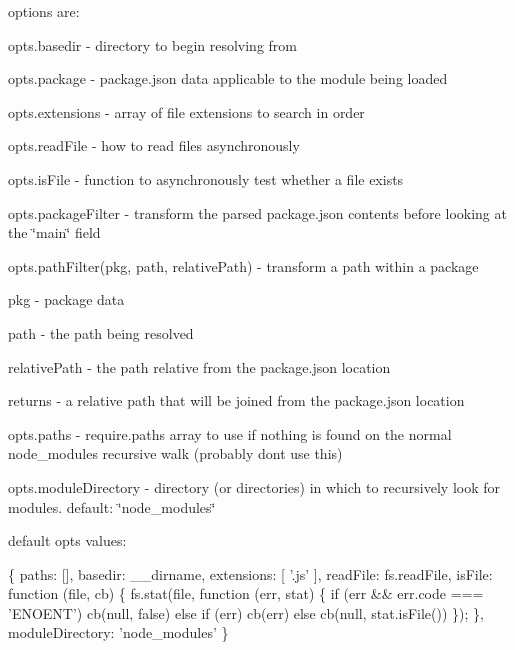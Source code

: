 options are\+:


\begin{DoxyItemize}
\item opts.\+basedir -\/ directory to begin resolving from
\item opts.\+package -\/ {\ttfamily package.\+json} data applicable to the module being loaded
\item opts.\+extensions -\/ array of file extensions to search in order
\item opts.\+read\+File -\/ how to read files asynchronously
\item opts.\+is\+File -\/ function to asynchronously test whether a file exists
\item opts.\+package\+Filter -\/ transform the parsed package.\+json contents before looking at the \char`\"{}main\char`\"{} field
\item opts.\+path\+Filter(pkg, path, relative\+Path) -\/ transform a path within a package
\begin{DoxyItemize}
\item pkg -\/ package data
\item path -\/ the path being resolved
\item relative\+Path -\/ the path relative from the package.\+json location
\item returns -\/ a relative path that will be joined from the package.\+json location
\end{DoxyItemize}
\item opts.\+paths -\/ require.\+paths array to use if nothing is found on the normal node\+\_\+modules recursive walk (probably don\textquotesingle{}t use this)
\item opts.\+module\+Directory -\/ directory (or directories) in which to recursively look for modules. default\+: {\ttfamily \char`\"{}node\+\_\+modules\char`\"{}}
\end{DoxyItemize}

default {\ttfamily opts} values\+:


\begin{DoxyCode}
\{
    paths: [],
    basedir: \_\_dirname,
    extensions: [ '.js' ],
    readFile: fs.readFile,
    isFile: function (file, cb) \{
        fs.stat(file, function (err, stat) \{
            if (err && err.code === 'ENOENT') cb(null, false)
            else if (err) cb(err)
            else cb(null, stat.isFile())
        \});
    \},
    moduleDirectory: 'node\_modules'
\}
\end{DoxyCode}


